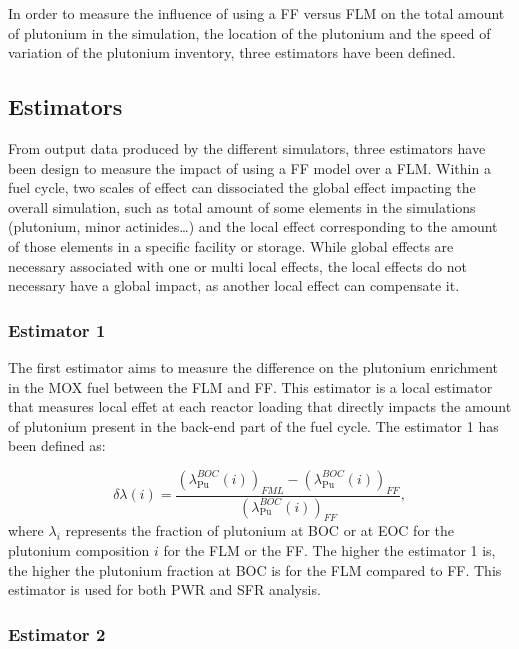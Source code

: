 In order to measure the influence of using a \gls{FF} versus \gls{FLM} on the total amount of plutonium in the simulation, the location of the plutonium and the speed of variation of the plutonium inventory, three estimators have been defined.

\subsection{Estimators\label{subsec:estimator}}

From output data produced by the different simulators, three estimators have been design to measure the impact of using a \gls{FF} model over a \gls{FLM}.
Within a fuel cycle, two scales of effect can dissociated the global effect impacting the overall simulation, such as total amount of some elements in the simulations (plutonium, minor actinides\ldots) and the local effect corresponding to the amount of those elements in a specific facility or storage.
While global effects are necessary associated with one or multi local effects, the local effects do not necessary have a global impact, as another local effect can compensate it.

\subsubsection{Estimator 1}

The first estimator aims to measure the difference on the plutonium enrichment in the \gls{MOX} fuel between the \gls{FLM} and \gls{FF}.
This estimator is a local estimator that measures local effet at each reactor loading that directly impacts the amount of plutonium present in the back-end part of the fuel cycle.
The estimator 1 has been defined as:

\begin{equation}
    \delta{\lambda}(i) =
        \frac{\left(\lambda_{\mathrm{Pu}}^{BOC}(i)\right)_{FML}
                - \left(\lambda_{\mathrm{Pu}}^{BOC}(i)\right)_{FF}}
             {\left(\lambda_{\mathrm{Pu}}^{BOC}(i)\right)_{FF}},
\end{equation}
where $\lambda_i$ represents the fraction of plutonium at \gls{BOC} or at \gls{EOC} for the plutonium composition $i$ for the \gls{FLM} or the \gls{FF}.
The higher the estimator 1 is, the higher the plutonium fraction at \gls{BOC} is for the \gls{FLM} compared to \gls{FF}.
This estimator is used for both \gls{PWR} and \gls{SFR} analysis.

\subsubsection{Estimator 2}

